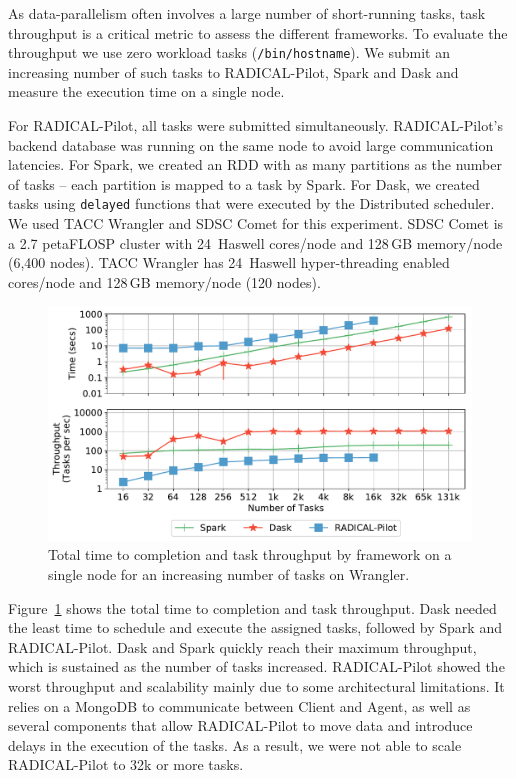 As data-parallelism often involves a large number of short-running tasks, task throughput is a critical metric to assess the different frameworks.
To evaluate the throughput we use zero workload tasks (\texttt{/bin/hostname}).
We submit an increasing number of such tasks to RADICAL-Pilot, Spark and Dask and measure the execution time on a single node.

For RADICAL-Pilot, all tasks were submitted simultaneously. 
RADICAL-Pilot's backend database was running on the same node to avoid large communication latencies.
For Spark, we created an RDD with as many partitions as the number of tasks -- each partition is mapped to a task by Spark.
For Dask, we created tasks using \texttt{delayed} functions that were executed by the Distributed scheduler.
We used TACC Wrangler and SDSC Comet for this experiment.
SDSC Comet is a 2.7 petaFLOSP cluster with 24\, Haswell cores/node and 128\,GB memory/node (6,400 nodes).
TACC Wrangler has 24\, Haswell hyper-threading enabled cores/node and 128\,GB memory/node (120 nodes).


\begin{figure}[t]
    \centering
    \includegraphics[width=.75\textwidth]{figures/data_analytics_hpc/task_par/dask_spark_rp_wrangler.pdf}
    \caption{Total time to completion and task throughput by framework on a single node for an increasing number of tasks on Wrangler.}
    \label{fig:dask_spark_rp_wrangler}
\end{figure}

Figure~\ref{fig:dask_spark_rp_wrangler} shows the total time to completion and task throughput.
Dask needed the least time to schedule and execute the assigned tasks, followed by Spark and RADICAL-Pilot.
Dask and Spark quickly reach their maximum throughput, which is sustained as the number of tasks increased.
RADICAL-Pilot showed the worst throughput and scalability mainly due to some architectural limitations.
It relies on a MongoDB to communicate between Client and Agent, as well as several components that allow RADICAL-Pilot to move data and introduce delays in the execution of the tasks.
As a result, we were not able to scale RADICAL-Pilot to 32k or more tasks.

